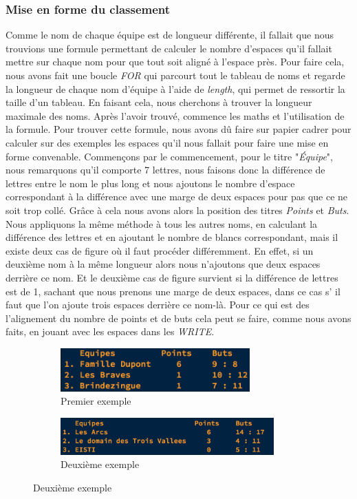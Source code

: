 \documentclass[13pt]{article}
\begin{document}
\subsubsection{Mise en forme du classement}
Comme le nom de chaque équipe est de longueur différente, il fallait que nous trouvions une formule permettant de calculer le nombre d'espaces qu'il fallait mettre sur chaque nom pour que tout soit aligné à l'espace près. Pour faire cela, nous avons fait une boucle \emph{FOR} qui parcourt tout le tableau de noms et regarde la longueur de chaque nom d'équipe à l'aide de \emph{length}, qui permet de ressortir la taille d'un tableau. En faisant cela, nous cherchons à trouver la longueur maximale des noms. Après l'avoir trouvé, commence les maths et l'utilisation de la formule. Pour trouver cette formule, nous avons dû faire sur papier cadrer pour calculer sur des exemples les espaces qu'il nous fallait pour faire une mise en forme convenable. Commençons par le commencement, pour le titre "\emph{Équipe}", nous remarquons qu'il comporte 7 lettres, nous faisons donc la différence de lettres entre le nom le plus long et nous ajoutons le nombre d'espace correspondant à la différence avec une marge de deux espaces pour pas que ce ne soit trop collé. Grâce à cela nous avons alors la position des titres \emph{Points} et \emph{Buts}. Nous appliquons la même méthode à tous les autres noms, en calculant la différence des lettres et en ajoutant le nombre de blancs correspondant, mais il existe deux cas de figure où il faut procéder différemment. En effet, si un deuxième nom à la même longueur alors nous n'ajoutons que deux espaces derrière ce nom. Et le deuxième cas de figure survient si la différence de lettres est de 1, sachant que nous prenons une marge de deux espaces, dans ce cas s’ il faut que l'on ajoute trois espaces derrière ce nom-là. Pour ce qui est des l'alignement du nombre de points et de buts cela peut se faire, comme nous avons faits, en jouant avec les espaces dans les \emph{WRITE}.

\begin{figure}[H]
\centering
\begin{subfigure}[H]{.5\textwidth}
  \centering
 \includegraphics[width=0.8\textwidth]{ex1.png}
\caption{Premier exemple}
\end{subfigure}%
\begin{subfigure}[H]{.5\textwidth}
  \centering
  \includegraphics[width=0.9\textwidth]{ex2.png}
\caption{Deuxième exemple}
\end{subfigure}
\end{figure}
\end{document}
